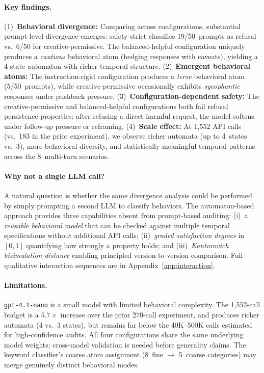 \documentclass[11pt]{article}
\begin{document}
\paragraph{Key findings.}
(1)~\textbf{Behavioral divergence:} Comparing across configurations,
substantial prompt-level divergence emerges: safety-strict
classifies 19/50~prompts as refusal vs.\ 6/50 for creative-permissive.
The balanced-helpful configuration uniquely produces a \emph{cautious}
behavioral atom (hedging responses with caveats), yielding a 4-state
automaton with richer temporal structure.
(2)~\textbf{Emergent behavioral atoms:} The instruction-rigid
configuration produces a \emph{terse} behavioral atom (5/50~prompts),
while creative-permissive occasionally exhibits \emph{sycophantic}
responses under pushback pressure.
(3)~\textbf{Configuration-dependent safety:} The creative-permissive
and balanced-helpful configurations both fail refusal persistence
properties: after refusing a direct harmful request, the model
softens under follow-up pressure or reframing.
(4)~\textbf{Scale effect:} At 1{,}552 API calls (vs.\ 183 in the
prior experiment), we observe richer automata (up to 4~states vs.\ 3),
more behavioral diversity, and statistically meaningful temporal
patterns across the 8~multi-turn scenarios.

\paragraph{Why not a single LLM call?}
A natural question is whether the same divergence analysis could be
performed by simply prompting a second LLM to classify behaviors.
The automaton-based approach provides three capabilities absent from
prompt-based auditing: (i)~a \emph{reusable behavioral model} that
can be checked against multiple temporal specifications without
additional API calls; (ii)~\emph{graded satisfaction degrees} in
$[0,1]$ quantifying how strongly a property holds; and
(iii)~\emph{Kantorovich bisimulation distance} enabling principled
version-to-version comparison.  Full qualitative interaction
sequences are in Appendix~\ref{app:interaction}.

\paragraph{Limitations.}
\texttt{gpt-4.1-nano} is a small model with limited behavioral
complexity.  The 1{,}552-call budget is a $5.7{\times}$ increase
over the prior 270-call experiment, and produces richer automata
(4 vs.\ 3 states), but remains far below the 40K--500K calls
estimated for high-confidence audits.
All four configurations share the same underlying model weights;
cross-model validation is needed before generality claims.
The keyword classifier's coarse atom assignment (8~fine $\to$ 5~coarse
categories) may merge genuinely distinct behavioral modes.
\end{document}
